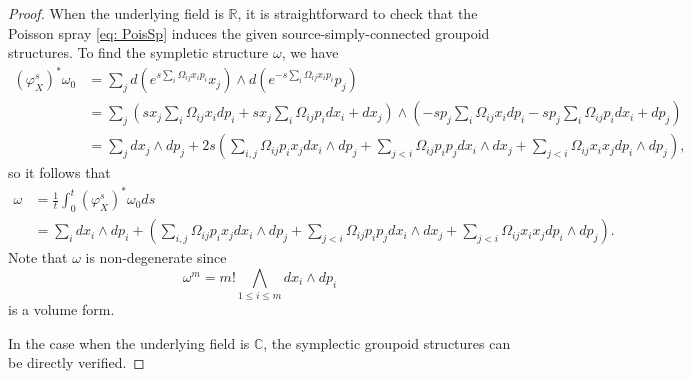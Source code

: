 \documentclass{amsart}
\numberwithin{equation}{section}
\newcommand{\CC}{\mathbb{C}}
\newcommand{\RR}{\mathbb{R}}
\begin{document}
\begin{proof}
  When the underlying field is $\RR$, it is straightforward to check that the Poisson spray \eqref{eq: PoisSp} induces the given source-simply-connected groupoid structures. To find the sympletic structure $\omega$, we have
\begin{align*}
		\left(\varphi_X^s\right)^*\omega_0 & = \sum_{j} d \left(e^{ s \sum_{i} \Omega_{ij} x_ip_i}x_j \right) \wedge d \left(e^{- s \sum_{i} \Omega_{ij} x_ip_i}p_j \right) \\
		& = \sum_{j} \left(s x_j \sum_{i} \Omega_{ij} x_i dp_i + s x_j \sum_{i} \Omega_{ij} p_i dx_i + d x_j \right) \wedge \left(- s p_j \sum_{i} \Omega_{ij} x_i dp_i - s p_j \sum_{i} \Omega_{ij} p_i dx_i + d p_j \right) \\
		& = \sum_{j} dx_j \wedge dp_j + 2s \left( \sum_{i, j} \Omega_{ij}p_i x_j d x_i \wedge d p_j  + \sum_{j < i} \Omega_{ij}p_ip_j d x_i \wedge d x_j + \sum_{j < i} \Omega_{ij}x_ix_j d p_i \wedge d p_j \right),
\end{align*}
so it follows that
\begin{align*}
		\omega & = \frac{1}{t}\int_{0}^{t} (\varphi_X^s)^*\omega_0 ds \\
		& = \sum_{i} dx_i \wedge dp_i
	  + \left(
	    \sum_{i, j} \Omega_{ij}p_ix_j dx_i \wedge dp_j 
	    + \sum_{j < i} \Omega_{ij}p_ip_j dx_i \wedge dx_j
	    + \sum_{j < i} \Omega_{ij}x_ix_j dp_i \wedge dp_j
	  \right).
	\end{align*}
Note that $\omega$ is non-degenerate since
  \[\omega^m = m! \bigwedge\limits_{1\leq i\leq m} dx_i \wedge dp_i\]
  is a volume form.

  In the case when the underlying field is $\CC$, the symplectic groupoid structures can be directly verified.
\end{proof}
\end{document}
